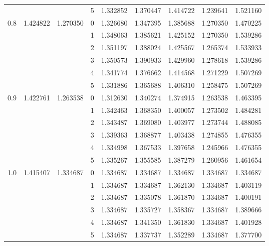 \begin{tabular}{llllrrrrr}
    &          &          & 5 &  1.332852 &  1.370447 &  1.414722 &  1.239641 &  1.521160 \\
0.8 & 1.424822 & 1.270350 & 0 &  1.326680 &  1.347395 &  1.385688 &  1.270350 &  1.470225 \\
    &          &          & 1 &  1.348063 &  1.385621 &  1.425152 &  1.270350 &  1.539286 \\
    &          &          & 2 &  1.351197 &  1.388024 &  1.425567 &  1.265374 &  1.533933 \\
    &          &          & 3 &  1.350573 &  1.390933 &  1.429960 &  1.278618 &  1.539286 \\
    &          &          & 4 &  1.341774 &  1.376662 &  1.414568 &  1.271229 &  1.507269 \\
    &          &          & 5 &  1.331886 &  1.365688 &  1.406310 &  1.258475 &  1.507269 \\
0.9 & 1.422761 & 1.263538 & 0 &  1.312630 &  1.340274 &  1.374915 &  1.263538 &  1.463395 \\
    &          &          & 1 &  1.342463 &  1.368350 &  1.400057 &  1.273502 &  1.484281 \\
    &          &          & 2 &  1.343487 &  1.369080 &  1.403977 &  1.273744 &  1.488085 \\
    &          &          & 3 &  1.339363 &  1.368877 &  1.403438 &  1.274855 &  1.476355 \\
    &          &          & 4 &  1.334998 &  1.367533 &  1.397658 &  1.245966 &  1.476355 \\
    &          &          & 5 &  1.335267 &  1.355585 &  1.387279 &  1.260956 &  1.461654 \\
1.0 & 1.415407 & 1.334687 & 0 &  1.334687 &  1.334687 &  1.334687 &  1.334687 &  1.334687 \\
    &          &          & 1 &  1.334687 &  1.334687 &  1.362130 &  1.334687 &  1.403119 \\
    &          &          & 2 &  1.334687 &  1.335078 &  1.361870 &  1.334687 &  1.400191 \\
    &          &          & 3 &  1.334687 &  1.335727 &  1.358367 &  1.334687 &  1.389666 \\
    &          &          & 4 &  1.334687 &  1.341350 &  1.361830 &  1.334687 &  1.401928 \\
    &          &          & 5 &  1.334687 &  1.337737 &  1.352289 &  1.334687 &  1.377700 \\
\bottomrule
\end{tabular}
